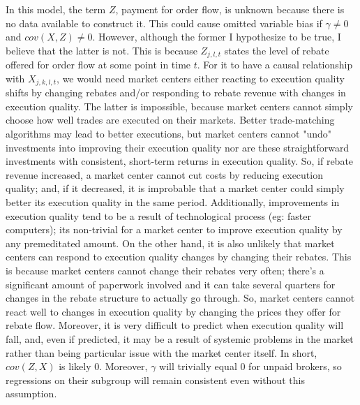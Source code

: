 \documentclass[11pt,a4paper]{article}
\begin{document}
	In this model, the term $Z$, payment for order flow, is unknown because there is no data available to construct it. This could cause omitted variable bias if $\gamma \neq 0$ and $cov(X, Z) \neq 0$. However, although the former I hypothesize to be true, I believe that the latter is not. This is because $Z_{j, l, t}$ states the level of rebate offered for order flow at some point in time $t$. For it to have a causal relationship with $X_{j, k, l, t}$, we would need market centers either reacting to execution quality shifts by changing rebates and/or responding to rebate revenue with changes in execution quality. The latter is impossible, because market centers cannot simply choose how well trades are executed on their markets. Better trade-matching algorithms may lead to better executions, but market centers cannot "undo" investments into improving their execution quality nor are these straightforward investments with consistent, short-term returns in execution quality. So, if rebate revenue increased, a market center cannot cut costs by reducing execution quality; and, if it decreased, it is improbable that a market center could simply better its execution quality in the same period. Additionally, improvements in execution quality tend to be a result of technological process (eg: faster computers); its non-trivial for a market center to improve execution quality by any premeditated amount. On the other hand, it is also unlikely that market centers can respond to execution quality changes by changing their rebates. This is because market centers cannot change their rebates very often; there's a significant amount of paperwork involved and it can take several quarters for changes in the rebate structure to actually go through. So, market centers cannot react well to changes in execution quality by changing the prices they offer for rebate flow. Moreover, it is very difficult to predict when execution quality will fall, and, even if predicted, it may be a result of systemic problems in the market rather than being particular issue with the market center itself. In short, $cov(Z, X)$ is likely $0$. Moreover, $\gamma$ will trivially equal $0$ for unpaid brokers, so regressions on their subgroup will remain consistent even without this assumption. 
	
\end{document}
